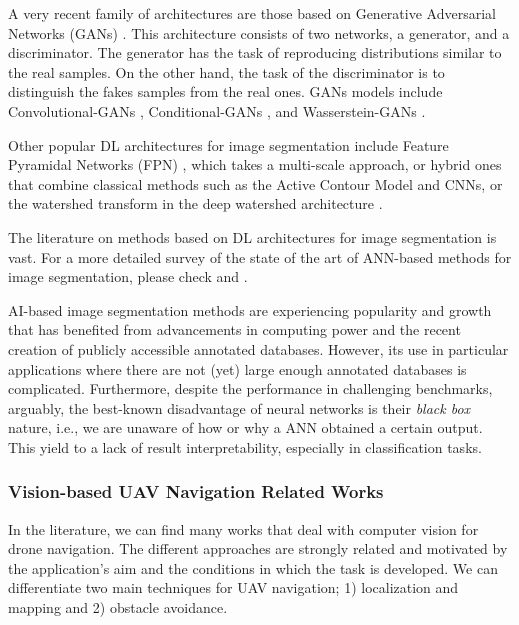 A very recent family of architectures are those based on Generative Adversarial Networks (GANs) \citep{Goodfellow.Pouget-Abadie.ea:NIPS:2014}. This architecture consists of two networks, a generator, and a discriminator. The generator has the task of reproducing distributions similar to the real samples. On the other hand, the task of the discriminator is to distinguish the fakes samples from the real ones. GANs models include Convolutional-GANs \citep{Radford.Metz.ea:arXiv:2016}, Conditional-GANs \citep{Mirza.Osindero:arXiv:2014}, and Wasserstein-GANs \citep{Arjovsky.Chintala.ea:arXiv:2017}.

Other popular DL architectures for image segmentation include Feature Pyramidal Networks (FPN) \citep{Lin.Dollar.ea:CVPR:2017}, which takes a multi-scale approach, or hybrid ones that combine classical methods such as the Active Contour Model \citep{Kass.Witkin.ea:JCV:1988} and CNNs, or the watershed transform in the deep watershed architecture \citep{Bai.Urtasun:CVPR:2017}. 

The literature on methods based on DL architectures for image segmentation is vast. For a more detailed survey of the state of the art of ANN-based methods for image segmentation, please check \citep{Sultana.Sufian.ea:KBS:2020} and \citep{Minaee.Boykov.ea:PAMI:2021}.

AI-based image segmentation methods are experiencing popularity and growth that has benefited from advancements in computing power and the recent creation of publicly accessible annotated databases. However, its use in particular applications where there are not (yet) large enough annotated databases is complicated. Furthermore, despite the performance in challenging benchmarks, arguably, the best-known disadvantage of neural networks is their \textit{black box} nature, i.e., we are unaware of how or why a ANN obtained a certain output. This yield to a lack of result interpretability, especially in classification tasks.

\subsubsection*{Vision-based UAV Navigation Related Works}
In the literature, we can find many works that deal with computer vision for drone navigation. The different approaches are strongly related and motivated by the application's aim and the conditions in which the task is developed. We can differentiate two main techniques for UAV navigation; 1) localization and mapping and 2) obstacle avoidance.

